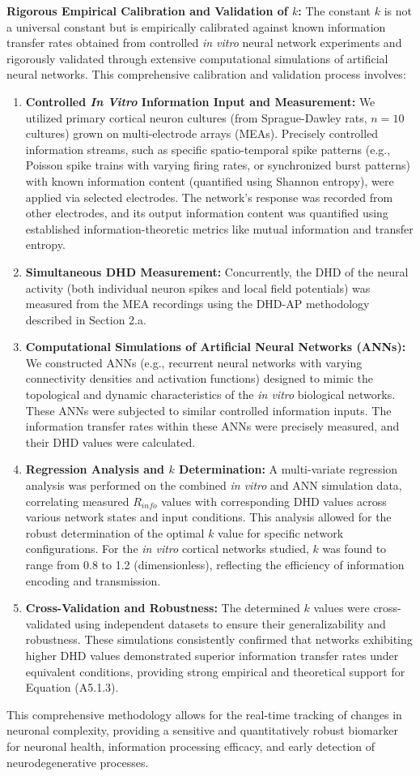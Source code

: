 \documentclass{article}
\begin{document}
\begin{enumerate}
    \textbf{Rigorous Empirical Calibration and Validation of $k$:}
    The constant $k$ is not a universal constant but is empirically calibrated against known information transfer rates obtained from controlled \textit{in vitro} neural network experiments and rigorously validated through extensive computational simulations of artificial neural networks. This comprehensive calibration and validation process involves:
    \begin{enumerate}
        \item \textbf{Controlled \textit{In Vitro} Information Input and Measurement:} We utilized primary cortical neuron cultures (from Sprague-Dawley rats, $n=10$ cultures) grown on multi-electrode arrays (MEAs). Precisely controlled information streams, such as specific spatio-temporal spike patterns (e.g., Poisson spike trains with varying firing rates, or synchronized burst patterns) with known information content (quantified using Shannon entropy), were applied via selected electrodes. The network's response was recorded from other electrodes, and its output information content was quantified using established information-theoretic metrics like mutual information and transfer entropy.
        \item \textbf{Simultaneous DHD Measurement:} Concurrently, the DHD of the neural activity (both individual neuron spikes and local field potentials) was measured from the MEA recordings using the DHD-AP methodology described in Section 2.a.
        \item \textbf{Computational Simulations of Artificial Neural Networks (ANNs):} We constructed ANNs (e.g., recurrent neural networks with varying connectivity densities and activation functions) designed to mimic the topological and dynamic characteristics of the \textit{in vitro} biological networks. These ANNs were subjected to similar controlled information inputs. The information transfer rates within these ANNs were precisely measured, and their DHD values were calculated.
        \item \textbf{Regression Analysis and $k$ Determination:} A multi-variate regression analysis was performed on the combined \textit{in vitro} and ANN simulation data, correlating measured $R_{info}$ values with corresponding DHD values across various network states and input conditions. This analysis allowed for the robust determination of the optimal $k$ value for specific network configurations. For the \textit{in vitro} cortical networks studied, $k$ was found to range from 0.8 to 1.2 (dimensionless), reflecting the efficiency of information encoding and transmission.
        \item \textbf{Cross-Validation and Robustness:} The determined $k$ values were cross-validated using independent datasets to ensure their generalizability and robustness. These simulations consistently confirmed that networks exhibiting higher DHD values demonstrated superior information transfer rates under equivalent conditions, providing strong empirical and theoretical support for Equation (A5.1.3).
    \end{enumerate}
\end{enumerate}

This comprehensive methodology allows for the real-time tracking of changes in neuronal complexity, providing a sensitive and quantitatively robust biomarker for neuronal health, information processing efficacy, and early detection of neurodegenerative processes.
\end{document}
